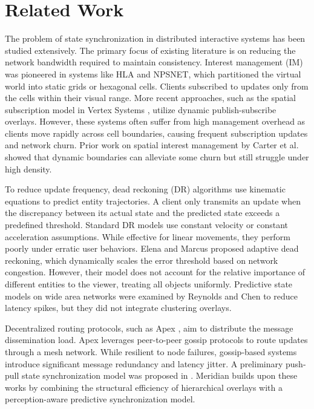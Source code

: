 \section{Related Work}
The problem of state synchronization in distributed interactive systems has been studied extensively. The primary focus of existing literature is on reducing the network bandwidth required to maintain consistency.
Interest management (IM) was pioneered in systems like HLA and NPSNET, which partitioned the virtual world into static grids or hexagonal cells. Clients subscribed to updates only from the cells within their visual range. More recent approaches, such as the spatial subscription model in Vertex Systems \cite{vertex2021latency}, utilize dynamic publish-subscribe overlays. However, these systems often suffer from high management overhead as clients move rapidly across cell boundaries, causing frequent subscription updates and network churn. Prior work on spatial interest management by Carter et al. \cite{carter2022interest} showed that dynamic boundaries can alleviate some churn but still struggle under high density.

To reduce update frequency, dead reckoning (DR) algorithms use kinematic equations to predict entity trajectories. A client only transmits an update when the discrepancy between its actual state and the predicted state exceeds a predefined threshold. Standard DR models use constant velocity or constant acceleration assumptions. While effective for linear movements, they perform poorly under erratic user behaviors. Elena and Marcus \cite{synapse2020overlay} proposed adaptive dead reckoning, which dynamically scales the error threshold based on network congestion. However, their model does not account for the relative importance of different entities to the viewer, treating all objects uniformly. Predictive state models on wide area networks were examined by Reynolds and Chen \cite{reynolds2021predictive} to reduce latency spikes, but they did not integrate clustering overlays.

Decentralized routing protocols, such as Apex \cite{apex2022routing}, aim to distribute the message dissemination load. Apex leverages peer-to-peer gossip protocols to route updates through a mesh network. While resilient to node failures, gossip-based systems introduce significant message redundancy and latency jitter. A preliminary push-pull state synchronization model was proposed in \cite{meridian2023preview}. Meridian builds upon these works by combining the structural efficiency of hierarchical overlays with a perception-aware predictive synchronization model.
